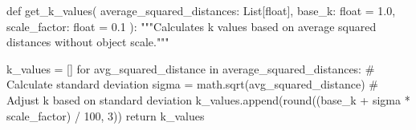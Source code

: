 \startPY
def get_k_values(
  average_squared_distances: List[float],
  base_k: float = 1.0,
  scale_factor: float = 0.1
  ):
  """Calculates k values based on average squared distances
  without object scale."""

  k_values = []
  for avg_squared_distance in average_squared_distances:
    # Calculate standard deviation
    sigma = math.sqrt(avg_squared_distance)
    # Adjust k based on standard deviation
    k_values.append(round((base_k + sigma * scale_factor) / 100, 3))
  return k_values
\stopPY
\stopbuffer
